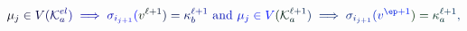 \documentclass[12pt]{article}
\begin{document}
\makeatletter
\renewcommand*{\@textcolor}[3]{%
  \protect\leavevmode
  \begingroup
    \color#1{#2}#3%
  \endgroup
}
\makeatother
\begin{displaymath}
\mathcolor[RGB]{0,0,15}{\mu} _ { \mathcolor[RGB]{0,0,30}{j} } \mathcolor[RGB]{0,0,45}{\in} \mathcolor[RGB]{0,0,60}{V} \mathcolor[RGB]{0,0,75}{(} \mathcal { \mathcolor[RGB]{0,0,90}{K} } _ { \mathcolor[RGB]{0,0,105}{a} } ^ { \mathcolor[RGB]{0,0,120}{e} \mathcolor[RGB]{0,0,135}{l} } \mathcolor[RGB]{0,0,150}{)} \mathcolor[RGB]{0,0,165}{\implies} \mathcolor[RGB]{0,0,180}{\sigma} _ { \mathcolor[RGB]{0,0,195}{i} _ { \mathcolor[RGB]{0,0,210}{j} \mathcolor[RGB]{0,0,225}{+} \mathcolor[RGB]{0,0,240}{1} } } \mathcolor[RGB]{0,0,255}{(} \mathcolor[RGB]{0,15,0}{v} ^ { \mathcolor[RGB]{0,15,15}{\ell} \mathcolor[RGB]{0,15,30}{+} \mathcolor[RGB]{0,15,45}{1} } \mathcolor[RGB]{0,15,60}{)} \mathcolor[RGB]{0,15,75}{=} \mathcolor[RGB]{0,15,90}{\kappa} _ { \mathcolor[RGB]{0,15,105}{b} } ^ { \mathcolor[RGB]{0,15,120}{\ell} \mathcolor[RGB]{0,15,135}{+} \mathcolor[RGB]{0,15,150}{1} } \mathrm { ~ \mathcolor[RGB]{0,15,165}{a} \mathcolor[RGB]{0,15,180}{n} \mathcolor[RGB]{0,15,195}{d} ~ } \mathcolor[RGB]{0,15,210}{\mu} _ { \mathcolor[RGB]{0,15,225}{j} } \mathcolor[RGB]{0,15,240}{\in} \mathcolor[RGB]{0,15,255}{V} \mathcolor[RGB]{0,30,0}{(} \mathcal { \mathcolor[RGB]{0,30,15}{K} } _ { \mathcolor[RGB]{0,30,30}{a} } ^ { \mathcolor[RGB]{0,30,45}{\ell} \mathcolor[RGB]{0,30,60}{+} \mathcolor[RGB]{0,30,75}{1} } \mathcolor[RGB]{0,30,90}{)} \mathcolor[RGB]{0,30,105}{\implies} \mathcolor[RGB]{0,30,120}{\sigma} _ { \mathcolor[RGB]{0,30,135}{i} _ { \mathcolor[RGB]{0,30,150}{j} \mathcolor[RGB]{0,30,165}{+} \mathcolor[RGB]{0,30,180}{1} } } \mathcolor[RGB]{0,30,195}{(} \mathcolor[RGB]{0,30,210}{v} ^ { \mathcolor[RGB]{0,30,225}{\ep} \mathcolor[RGB]{0,30,240}{+} \mathcolor[RGB]{0,30,255}{1} } \mathcolor[RGB]{0,45,0}{)} \mathcolor[RGB]{0,45,15}{=} \mathcolor[RGB]{0,45,30}{\kappa} _ { \mathcolor[RGB]{0,45,45}{a} } ^ { \mathcolor[RGB]{0,45,60}{\ell} \mathcolor[RGB]{0,45,75}{+} \mathcolor[RGB]{0,45,90}{1} } \mathcolor[RGB]{0,45,105}{,}
\end{displaymath}
\end{document}
